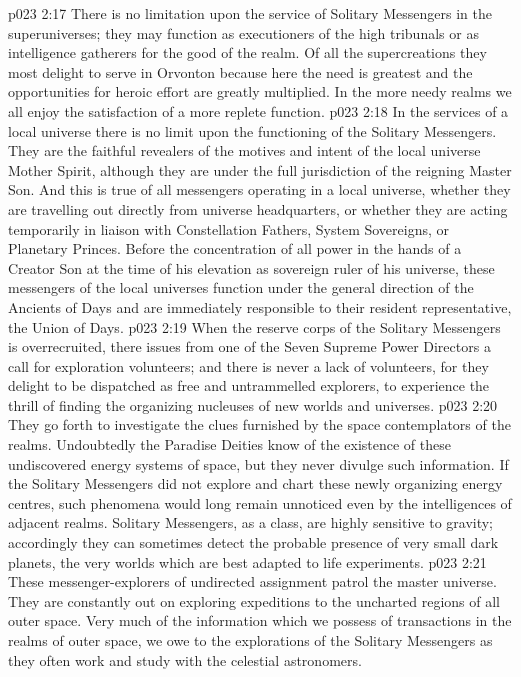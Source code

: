 \vs p023 2:17 There is no limitation upon the service of Solitary Messengers in the superuniverses; they may function as executioners of the high tribunals or as intelligence gatherers for the good of the realm. Of all the supercreations they most delight to serve in Orvonton because here the need is greatest and the opportunities for heroic effort are greatly multiplied. In the more needy realms we all enjoy the satisfaction of a more replete function.
\vs p023 2:18 \bibnobreakspace {} In the services of a local universe there is no limit upon the functioning of the Solitary Messengers. They are the faithful revealers of the motives and intent of the local universe Mother Spirit, although they are under the full jurisdiction of the reigning Master Son. And this is true of all messengers operating in a local universe, whether they are travelling out directly from universe headquarters, or whether they are acting temporarily in liaison with Constellation Fathers, System Sovereigns, or Planetary Princes. Before the concentration of all power in the hands of a Creator Son at the time of his elevation as sovereign ruler of his universe, these messengers of the local universes function under the general direction of the Ancients of Days and are immediately responsible to their resident representative, the Union of Days.
\vs p023 2:19 \bibnobreakspace {} When the reserve corps of the Solitary Messengers is overrecruited, there issues from one of the Seven Supreme Power Directors a call for exploration volunteers; and there is never a lack of volunteers, for they delight to be dispatched as free and untrammelled explorers, to experience the thrill of finding the organizing nucleuses of new worlds and universes.
\vs p023 2:20 They go forth to investigate the clues furnished by the space contemplators of the realms. Undoubtedly the Paradise Deities know of the existence of these undiscovered energy systems of space, but they never divulge such information. If the Solitary Messengers did not explore and chart these newly organizing energy centres, such phenomena would long remain unnoticed even by the intelligences of adjacent realms. Solitary Messengers, as a class, are highly sensitive to gravity; accordingly they can sometimes detect the probable presence of very small dark planets, the very worlds which are best adapted to life experiments.
\vs p023 2:21 These messenger\hyp{}explorers of undirected assignment patrol the master universe. They are constantly out on exploring expeditions to the uncharted regions of all outer space. Very much of the information which we possess of transactions in the realms of outer space, we owe to the explorations of the Solitary Messengers as they often work and study with the celestial astronomers.
